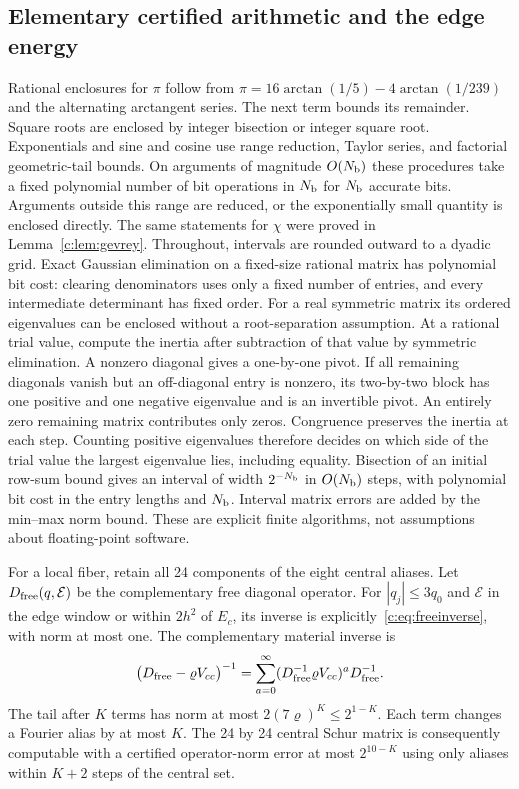 \subsection{Elementary certified arithmetic and the edge energy}
Rational enclosures for $\pi$ follow from
$\pi=16\arctan(1/5)-4\arctan(1/239)$ and the alternating arctangent
series. The next term bounds its remainder. Square roots are enclosed
by integer bisection or integer square root. Exponentials and sine and
cosine use range reduction, Taylor series, and factorial geometric-tail
bounds. On arguments of magnitude $O(N_{\rm b})$ these procedures take a fixed
polynomial number of bit operations in $N_{\rm b}$ for $N_{\rm b}$ accurate bits.
Arguments outside this range are reduced, or the exponentially small
quantity is enclosed directly. The same statements for $\chi$ were
proved in Lemma~\ref{c:lem:gevrey}. Throughout, intervals are rounded
outward to a dyadic grid. Exact Gaussian elimination on a fixed-size rational matrix has
polynomial bit cost: clearing denominators uses only a fixed number
of entries, and every intermediate determinant has fixed order.
For a real symmetric matrix its ordered eigenvalues can be enclosed
without a root-separation assumption. At a rational trial value,
compute the inertia after subtraction of that value by symmetric
elimination. A nonzero diagonal gives a one-by-one pivot. If all
remaining diagonals vanish but an off-diagonal entry is nonzero,
its two-by-two block has one positive and one negative eigenvalue
and is an invertible pivot. An entirely zero remaining matrix
contributes only zeros. Congruence preserves the inertia at each
step. Counting positive eigenvalues therefore decides on which side
of the trial value the largest eigenvalue lies, including equality.
Bisection of an initial row-sum bound gives an interval of width
$2^{-N_{\rm b}}$ in $O(N_{\rm b})$ steps, with polynomial bit cost in the entry
lengths and $N_{\rm b}$. Interval matrix errors are added by the min--max
norm bound. These are explicit finite algorithms, not assumptions
about floating-point software.

For a local fiber, retain all 24 components of the eight central
aliases. Let $D_{\rm free}(q,\mathcal E)$ be the complementary free diagonal operator.
For $|q_j|\le3q_0$ and $\mathcal E$ in the edge window or within $2h^2$ of
$E_c$, its inverse is explicitly~\eqref{c:eq:freeinverse}, with norm
at most one. The complementary material inverse is
\begin{equation}
 \big(D_{\rm free}-\varrho V_{cc}\big)^{-1}
 =\sum_{a=0}^{\infty}
       (D_{\rm free}^{-1}\varrho V_{cc})^aD_{\rm free}^{-1}.              \label{c:eq:neumanncalibration}
\end{equation}
The tail after $K$ terms has norm at most $2(7\varrho)^K\le2^{1-K}$.
Each term changes a Fourier alias by at most $K$. The 24 by 24
central Schur matrix is consequently computable with a certified
operator-norm error at most $2^{10-K}$ using only aliases within
$K+2$ steps of the central set.

